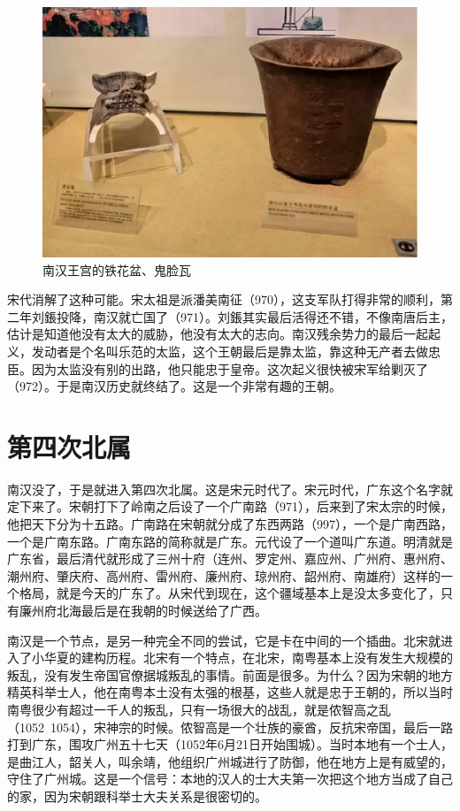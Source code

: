 \begin{figure}
	\centering
	\includegraphics[width=\textwidth]{images/image-35}
	\caption{南汉王宫的铁花盆、鬼脸瓦}
\end{figure}

宋代消解了这种可能。宋太祖是派潘美南征（970），这支军队打得非常的顺利，第二年刘鋹投降，南汉就亡国了（971）。刘鋹其实最后活得还不错，不像南唐后主，估计是知道他没有太大的威胁，他没有太大的志向。南汉残余势力的最后一起起义，发动者是个名叫乐范的太监，这个王朝最后是靠太监，靠这种无产者去做忠臣。因为太监没有别的出路，他只能忠于皇帝。这次起义很快被宋军给剿灭了（972）。于是南汉历史就终结了。这是一个非常有趣的王朝。

\section{第四次北属}

南汉没了，于是就进入第四次北属。这是宋元时代了。宋元时代，广东这个名字就定下来了。宋朝打下了岭南之后设了一个广南路（971），后来到了宋太宗的时候，他把天下分为十五路。广南路在宋朝就分成了东西两路（997），一个是广南西路，一个是广南东路。广南东路的简称就是广东。元代设了一个道叫广东道。明清就是广东省，最后清代就形成了三州十府（连州、罗定州、嘉应州、广州府、惠州府、潮州府、肇庆府、高州府、雷州府、廉州府、琼州府、韶州府、南雄府）这样的一个格局，就是今天的广东了。从宋代到现在，这个疆域基本上是没太多变化了，只有廉州府北海最后是在我朝的时候送给了广西。

南汉是一个节点，是另一种完全不同的尝试，它是卡在中间的一个插曲。北宋就进入了小华夏的建构历程。北宋有一个特点，在北宋，南粤基本上没有发生大规模的叛乱，没有发生帝国官僚据城叛乱的事情。前面是很多。为什么？因为宋朝的地方精英科举士人，他在南粤本土没有太强的根基，这些人就是忠于王朝的，所以当时南粤很少有超过一千人的叛乱，只有一场很大的战乱，就是侬智高之乱（1052~1054），宋神宗的时候。侬智高是一个壮族的豪酋，反抗宋帝国，最后一路打到广东，围攻广州五十七天（1052年6月21日开始围城）。当时本地有一个士人，是曲江人，韶关人，叫余靖，他组织广州城进行了防御，他在地方上是有威望的，守住了广州城。这是一个信号：本地的汉人的士大夫第一次把这个地方当成了自己的家，因为宋朝跟科举士大夫关系是很密切的。

